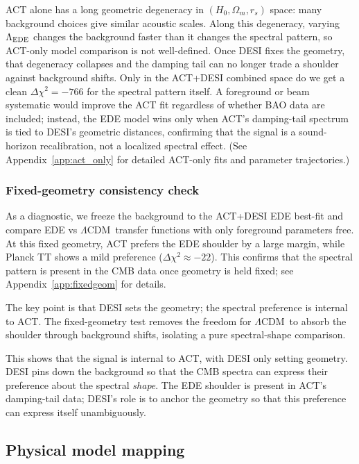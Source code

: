 \documentclass[twocolumn,showpacs,preprintnumbers,amsmath,amssymb,prd]{revtex4-2}
\newcommand{\lcdm}{$\Lambda$CDM}
\begin{document}
ACT alone has a long geometric degeneracy in $(H_0, \Omega_m, r_s)$ space: 
many background choices give similar acoustic scales. Along this degeneracy, 
varying $\Lambda_{\rm EDE}$ changes the background faster than it changes the 
spectral pattern, so ACT-only model comparison is not well-defined. Once DESI 
fixes the geometry, that degeneracy collapses and the damping tail can no longer 
trade a shoulder against background shifts. Only in the ACT+DESI combined space 
do we get a clean $\Delta\chi^2 = -766$ for the spectral pattern itself. 
A foreground or beam systematic would improve the ACT fit regardless of whether 
BAO data are included; instead, the EDE model wins only when ACT's damping-tail 
spectrum is tied to DESI's geometric distances, confirming that the signal is a 
sound-horizon recalibration, not a localized spectral effect. (See 
Appendix~\ref{app:act_only} for detailed ACT-only fits and parameter trajectories.)

\subsubsection{Fixed-geometry consistency check}
\label{sec:fixed_geometry}

As a diagnostic, we freeze the background to the ACT+DESI EDE best-fit and 
compare EDE vs \lcdm\ transfer functions with only foreground parameters free. 
At this fixed geometry, ACT prefers the EDE shoulder by a large margin, while 
Planck TT shows a mild preference ($\Delta\chi^2 \approx -22$). This confirms 
that the spectral pattern is present in the CMB data once geometry is held 
fixed; see Appendix~\ref{app:fixedgeom} for details.

The key point is that DESI sets the geometry; the spectral preference is 
internal to ACT. The fixed-geometry test removes the freedom for \lcdm\ to 
absorb the shoulder through background shifts, isolating a pure spectral-shape 
comparison.

This shows that the signal is internal to ACT, with DESI only setting 
geometry. DESI pins down the background so that the CMB spectra can express 
their preference about the spectral \emph{shape}. The EDE shoulder is present 
in ACT's damping-tail data; DESI's role is to anchor the geometry so that 
this preference can express itself unambiguously.

\subsection{Physical model mapping}
\label{sec:free_lambda}
\end{document}
